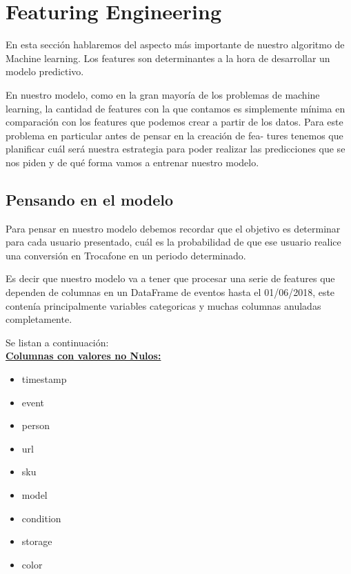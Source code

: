 \documentclass[a4paper ,12pt]{article}
\begin{document}
\newpage
\section{Featuring Engineering}

En esta sección hablaremos del aspecto más importante de nuestro algoritmo de Machine learning. Los features son determinantes a la hora de desarrollar un modelo predictivo. 

En nuestro modelo, como en la gran mayoría de los problemas de machine learning, la cantidad de features con la que contamos es simplemente mínima en comparación con los features que podemos crear a partir de los datos.
Para este problema en particular antes de pensar en la creación de fea-
tures tenemos que planificar cuál será nuestra estrategia para poder realizar las
predicciones que se nos piden y de qué forma vamos a entrenar nuestro modelo.

\subsection{Pensando en el modelo}

Para pensar en nuestro modelo debemos recordar que el objetivo es determinar para cada usuario presentado, cuál es la probabilidad de que ese usuario realice una conversión en Trocafone en un periodo determinado.

Es decir que nuestro modelo va a tener que procesar una serie de features que
dependen de columnas en un DataFrame de eventos hasta el 01/06/2018, este contenía principalmente variables categoricas y muchas columnas anuladas completamente.

Se listan a continuación: \\


\textbf{\underline{Columnas con valores no Nulos:}}

\begin{itemize}
	
	
	\item timestamp
	\item event 
	\item person 
	\item url 
	\item sku  
	\item model 
	\item condition 
	\item storage
	\item color 

	
\end{itemize}
\end{document}
